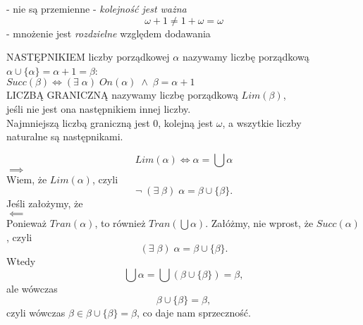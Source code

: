 \indent - nie są przemienne - \emph{kolejność jest ważna}
$$\omega+1\neq1+\omega=\omega$$
\indent - mnożenie jest \emph{rozdzielne }względem dodawania\medskip\\
\medskip
\begin{center}\large
    {\color{def}NASTĘPNIKIEM }liczby porządkowej $\alpha$ nazywamy liczbę porządkową $\alpha\cup\{\alpha\}=\alpha+1=\beta$:\smallskip\\
    $Succ(\beta)\iff(\exists\;\alpha)\;On(\alpha)\;\land\;\beta=\alpha+1$\medskip\\
    {\color{def}LICZBĄ GRANICZNĄ} nazywamy liczbę porządkową $Lim(\beta)$, \\jeśli nie jest ona następnikiem innej liczby.\medskip\\
    \normalsize Najmniejszą liczbą graniczną jest 0, kolejną jest $\omega$, a wszytkie liczby \\naturalne są następnikami.
\end{center}\bigskip

{\large
$$Lim(\alpha)\iff\alpha=\bigcup\alpha$$}
\dowod
$\implies$\medskip\\
Wiem, że $Lim(\alpha)$, czyli
$$\neg\;(\exists\;\beta)\;\alpha=\beta\cup\{\beta\}.$$
Jeśli założymy, że \bigskip\\
$\impliedby$\medskip\\
Ponieważ $Tran(\alpha)$, to również $Tran(\bigcup\alpha)$. Załóżmy, nie wprost, że $Succ(\alpha)$, czyli
$$(\exists\;\beta)\;\alpha=\beta\cup\{\beta\}.$$
Wtedy
$$\bigcup\alpha=\bigcup(\beta\cup\{\beta\})=\beta,$$
ale wówczas
$$\beta\cup\{\beta\}=\beta,$$
czyli wówczas $\beta\in\beta\cup\{\beta\}=\beta$, co daje nam sprzeczność.

